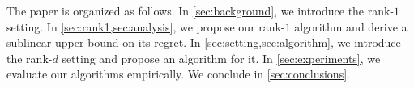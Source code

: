 
The paper is organized as follows. In \cref{sec:background}, we introduce the rank-$1$ setting. In \cref{sec:rank1,sec:analysis}, we propose our rank-$1$ algorithm and derive a sublinear upper bound on its regret. In \cref{sec:setting,sec:algorithm}, we introduce the rank-$d$ setting and propose an algorithm for it. In \cref{sec:experiments}, we evaluate our algorithms empirically. We conclude in \cref{sec:conclusions}. 

